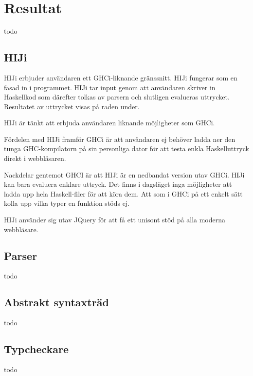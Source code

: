 \section{Resultat}
todo

\subsection{HIJi} 
HIJi erbjuder användaren ett GHCi-liknande gränssnitt. HIJi fungerar som en fasad in i programmet. 
HIJi tar input genom att användaren skriver in Haskellkod som därefter tolkas av parsern och slutligen evalueras uttrycket. Resultatet av uttrycket visas på raden under.

HIJi är tänkt att erbjuda användaren liknande möjligheter som GHCi. 

Fördelen med HIJi framför GHCi är att användaren ej behöver ladda ner den tunga GHC-kompilatorn på sin personliga dator för att testa enkla Haskelluttryck direkt i webbläsaren.

Nackdelar gentemot GHCI är att HIJi är en nedbandat version utav GHCi. HIJi kan bara evaluera enklare uttryck. Det finns i dagsläget inga möjligheter att ladda upp hela Haskell-filer för att köra dem. Att som i GHCi på ett enkelt sätt kolla upp vilka typer en funktion stöds ej.

HIJi använder sig utav JQuery för att få ett unisont stöd på alla moderna webbläsare.

\subsection{Parser} 
todo

\subsection{Abstrakt syntaxträd} 
todo

\subsection{Typcheckare} 
todo

